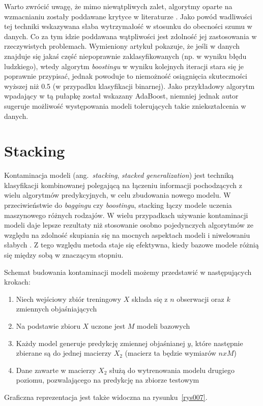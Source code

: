\documentclass[12pt,a4paper,twoside,openany]{book}
\begin{document}
Warto zwrócić uwagę, że mimo niewątpliwych zalet, algorytmy oparte na wzmacnianiu zostały poddawane krytyce w literaturze \citep{long2010}. Jako powód wadliwości tej techniki wskazywana słaba wytrzymałość w stosunku do obecności szumu w danych. Co za tym idzie poddawana wątpliwości jest zdolność jej zastosowania w rzeczywistych problemach. Wymieniony artykuł pokazuje, że jeśli w danych znajduje się jakaś część niepoprawnie zaklasyfikowanych (np. w wyniku błędu ludzkiego), wtedy algorytm \textit{boostingu} w wyniku kolejnych iteracji stara się je poprawnie przypisać, jednak powoduje to niemożność osiągnięcia skuteczności wyższej niż 0.5 (w przypadku klasyfikacji binarnej). Jako przykładowy algorytm wpadający w tą pułapkę został wskazany AdaBoost, niemniej jednak autor sugeruje możliwość występowania modeli tolerujących takie zniekształcenia w danych.

\section{Stacking}

Kontaminacja modeli (ang.~\textit{stacking}, \textit{stacked generalization}) jest techniką klasyfikacji kombinowanej polegającą na łączeniu informacji pochodzących z wielu algorytmów predykcyjnych, w celu zbudowania nowego modelu. W przeciwieństwie do \textit{baggingu} czy \textit{boostingu}, stacking łączy modele uczenia maszynowego różnych rodzajów. W wielu przypadkach używanie kontaminacji modeli daje lepsze rezultaty niż stosowanie osobno pojedynczych algorytmów ze względu na zdolność skupiania się na mocnych aspektach modeli i niwelowaniu słabych \citep{wolpert1992}. Z tego względu metoda staje się efektywna, kiedy bazowe modele różnią się między sobą w znaczącym stopniu.

Schemat budowania kontaminacji modeli możemy przedstawić w następujących krokach:
\begin{enumerate}
\item Niech wejściowy zbiór treningowy $X$ składa się z $n$ obserwacji oraz $k$ zmiennych objaśniających
\item Na podstawie zbioru $X$ uczone jest $M$ modeli bazowych
\item Każdy model generuje predykcję zmiennej objaśnianej $y$, które następnie zbierane są do jednej macierzy $X_2$ (macierz ta będzie wymiarów $n x M$)
\item Dane zawarte w macierzy $X_2$ służą do wytrenowania modelu drugiego poziomu, pozwalającego na predykcję na zbiorze testowym
\end{enumerate}
Graficzna reprezentacja jest także widoczna na rysunku~\ref{rys007}.
\end{document}
